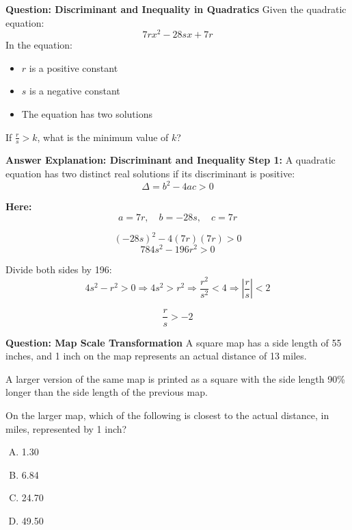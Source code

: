 \documentclass{beamer}
\begin{document}
\begin{frame}{\textbf{Question: Discriminant and Inequality in Quadratics}}
\small
Given the quadratic equation:
\[
7rx^2 - 28sx + 7r
\]
In the equation:
\begin{itemize}
    \item \( r \) is a positive constant
    \item \( s \) is a negative constant
    \item The equation has two solutions
\end{itemize}

If \( \frac{r}{s} > k \), what is the minimum value of \( k \)?
\end{frame}


\begin{frame}
{\textbf{Answer Explanation: Discriminant and Inequality}}
\small
\textbf{Step 1:} A quadratic equation has two distinct real solutions if its discriminant is positive:
\[
\Delta = b^2 - 4ac > 0
\]

\textbf{Here:}
\[
a = 7r, \quad b = -28s, \quad c = 7r
\]

\pause

\[
(-28s)^2 - 4(7r)(7r) > 0
\]
\[
784s^2 - 196r^2 > 0
\]

Divide both sides by 196:
\[
4s^2 - r^2 > 0
\Rightarrow 4s^2 > r^2
\Rightarrow \frac{r^2}{s^2} < 4
\Rightarrow \left| \frac{r}{s} \right| < 2
\]

\[\frac{r}{s}>-2\]

\end{frame}


\begin{frame}{\textbf{Question: Map Scale Transformation}}
\small
A square map has a side length of 55 inches, and 1 inch on the map represents an actual distance of 13 miles.

A larger version of the same map is printed as a square with the side length 90\% longer than the side length of the previous map.

On the larger map, which of the following is closest to the actual distance, in miles, represented by 1 inch?

\begin{enumerate}[(A)]
    \item 1.30
    \item 6.84
    \item 24.70
    \item 49.50
\end{enumerate}
\end{frame}
\end{document}
